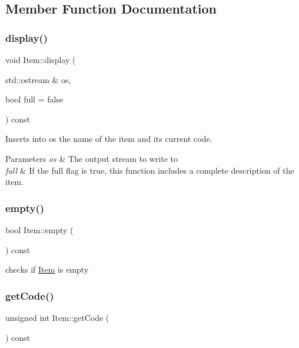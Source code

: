 \subsection{Member Function Documentation}
\mbox{\label{class_item_a9433e55e0165564bbbdb77bd01853728}} 
\subsubsection{\texorpdfstring{display()}{display()}}
{\footnotesize\ttfamily void Item\+::display (\begin{DoxyParamCaption}\item[{std\+::ostream \&}]{os,  }\item[{bool}]{full = {\ttfamily false} }\end{DoxyParamCaption}) const}



Inserts into os the name of the item and its current code. 


\begin{DoxyParams}{Parameters}
{\em os} & The output stream to write to \\
\hline
{\em full} & If the full flag is true, this function includes a complete description of the item. \\
\hline
\end{DoxyParams}
\mbox{\label{class_item_a8a1745ce42e5695d5c63c62bd5be7d8e}} 
\subsubsection{\texorpdfstring{empty()}{empty()}}
{\footnotesize\ttfamily bool Item\+::empty (\begin{DoxyParamCaption}{ }\end{DoxyParamCaption}) const}



checks if \mbox{\hyperlink{class_item}{Item}} is empty 

\mbox{\label{class_item_a359a6949cfad6cfb7f7d85e132525056}} 
\subsubsection{\texorpdfstring{get\+Code()}{getCode()}}
{\footnotesize\ttfamily unsigned int Item\+::get\+Code (\begin{DoxyParamCaption}{ }\end{DoxyParamCaption}) const}



